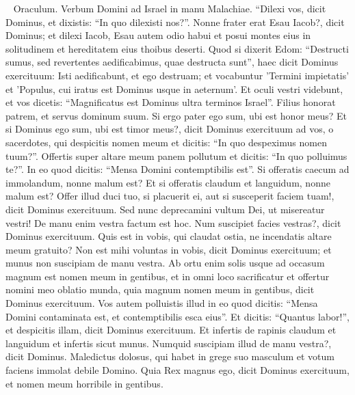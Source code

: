
\begin{biblechapter}   
\verse Oraculum. Verbum Domini ad Israel in manu Malachiae. 
\verse “Dilexi vos, dicit Dominus, et dixistis: “In quo dilexisti nos?”. Nonne frater erat Esau Iacob?, dicit Dominus; et dilexi Iacob, 
\verse Esau autem odio habui et posui montes eius in solitudinem et hereditatem eius thoibus deserti.  
\verse Quod si dixerit Edom: “Destructi sumus, sed revertentes aedificabimus, quae destructa sunt”, haec dicit Dominus exercituum: Isti aedificabunt, et ego destruam; et vocabuntur 'Termini impietatis' et 'Populus, cui iratus est Dominus usque in aeternum'. 
\verse Et oculi vestri videbunt, et vos dicetis: “Magnificatus est Dominus ultra terminos Israel”. 
\verse Filius honorat patrem, et servus dominum suum. Si ergo pater ego sum, ubi est honor meus? Et si Dominus ego sum, ubi est timor meus?, dicit Dominus exercituum ad vos, o sacerdotes, qui despicitis nomen meum et dicitis: “In quo despeximus nomen tuum?”. 
\verse Offertis super altare meum panem pollutum et dicitis: “In quo polluimus te?”. In eo quod dicitis: “Mensa Domini contemptibilis est”. 
\verse Si offeratis caecum ad immolandum, nonne malum est? Et si offeratis claudum et languidum, nonne malum est? Offer illud duci tuo, si placuerit ei, aut si susceperit faciem tuam!, dicit Dominus exercituum. 
\verse Sed nunc deprecamini vultum Dei, ut misereatur vestri! De manu enim vestra factum est hoc. Num suscipiet facies vestras?, dicit Dominus exercituum. 
\verse Quis est in vobis, qui claudat ostia, ne incendatis altare meum gratuito? Non est mihi voluntas in vobis, dicit Dominus exercituum; et munus non suscipiam de manu vestra. 
\verse Ab ortu enim solis usque ad occasum magnum est nomen meum in gentibus, et in omni loco sacrificatur et offertur nomini meo oblatio munda, quia magnum nomen meum in gentibus, dicit Dominus exercituum. 
\verse Vos autem polluistis illud in eo quod dicitis: “Mensa Domini contaminata est, et contemptibilis esca eius”. 
\verse Et dicitis: “Quantus labor!”, et despicitis illam, dicit Dominus exercituum. Et infertis de rapinis claudum et languidum et infertis sicut munus. Numquid suscipiam illud de manu vestra?, dicit Dominus.  
\verse Maledictus dolosus, qui habet in grege suo masculum et votum faciens immolat debile Domino. Quia Rex magnus ego, dicit Dominus exercituum, et nomen meum horribile in gentibus. 
\end{biblechapter}


